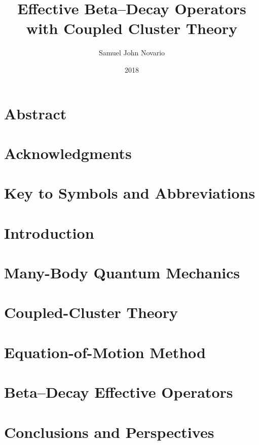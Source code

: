 \documentclass[dissertation]{msudissertation}
\author{Samuel John Novario}
\title{Effective Beta--Decay Operators with Coupled Cluster Theory}
\date{2018}
\begin{document}
\frontmatter
\maketitle


\chapter{Abstract}


\chapter{Acknowledgments}


\tableofcontents
\listoftables
\listoffigures

\chapter{Key to Symbols and Abbreviations}


\mainmatter

\chapter{Introduction} \label{chapter:introduction}


\chapter{Many-Body Quantum Mechanics} \label{chapter:manybody}


\chapter{Coupled-Cluster Theory} \label{chapter:cc}


\chapter{Equation-of-Motion Method} \label{chapter:eom}


\chapter{Beta--Decay Effective Operators} \label{chapter:betadecay}


\chapter{Conclusions and Perspectives} \label{chapter:conclusions}


\appendix



\renewcommand{\bibname}{References}

\end{document}
